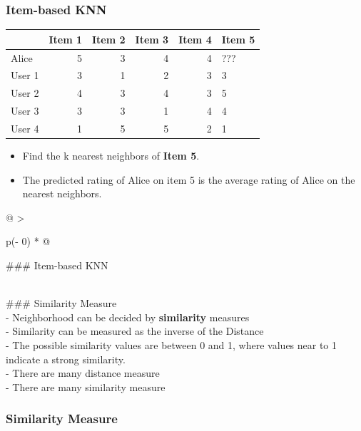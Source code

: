\documentclass[
]{article}
\providecommand{\tightlist}{%
  \setlength{\itemsep}{0pt}\setlength{\parskip}{0pt}}
\begin{document}
\hypertarget{item-based-knn}{%
\subsubsection{Item-based KNN}\label{item-based-knn}}

\begin{longtable}[]{@{}lrrrrl@{}}
\toprule
& Item 1 & Item 2 & Item 3 & Item 4 & Item 5 \\
\midrule
\endhead
Alice & 5 & 3 & 4 & 4 & ??? \\
User 1 & 3 & 1 & 2 & 3 & 3 \\
User 2 & 4 & 3 & 4 & 3 & 5 \\
User 3 & 3 & 3 & 1 & 4 & 4 \\
User 4 & 1 & 5 & 5 & 2 & 1 \\
\bottomrule
\end{longtable}

\begin{itemize}
\tightlist
\item
  Find the k nearest neighbors of \textbf{Item 5}.
\item
  The predicted rating of Alice on item 5 is the average rating of Alice
  on the nearest neighbors.
\end{itemize}

\begin{longtable}[]{@{}
  >{\raggedright\arraybackslash}p{(\columnwidth - 0\tabcolsep) * }@{}}
\toprule
\begin{minipage}[b]{\linewidth}\raggedright
\#\#\# Item-based KNN
\end{minipage} \\
\midrule
\endhead
\#\#\# Similarity Measure \\
- Neighborhood can be decided by \textbf{similarity} measures \\
- Similarity can be measured as the inverse of the Distance \\
- The possible similarity values are between 0 and 1, where values near
to 1 indicate a strong similarity. \\
- There are many distance measure \\
- There are many similarity measure \\
\bottomrule
\end{longtable}

\hypertarget{similarity-measure}{%
\subsubsection{Similarity Measure}\label{similarity-measure}}
\end{document}
